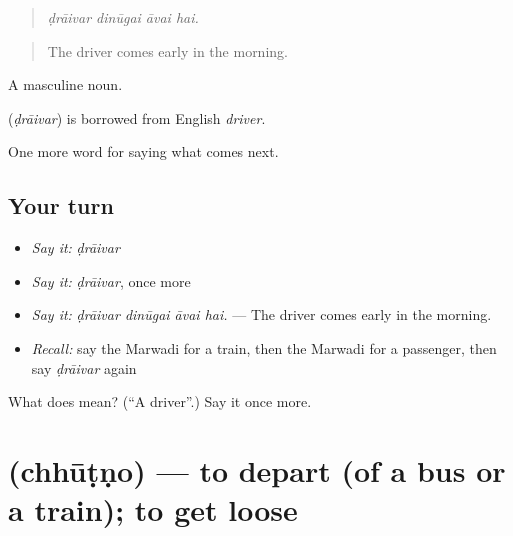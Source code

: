\begin{quote}
   
\end{quote}

\begin{quote}
\emph{ḍrāivar dinūgai āvai hai.}
\end{quote}

\begin{quote}
The driver comes early in the morning.
\end{quote}

A masculine noun.

\begin{cousinweb}
\textbf{} (\emph{ḍrāivar}) is borrowed from English \emph{driver}.
\end{cousinweb}

\begin{grammarlens}[title={What you've built}]
One more word for saying what comes next.
\end{grammarlens}

\subsection*{Your turn}
\begin{itemize}
\raggedright
  \item \emph{Say it:} \emph{ḍrāivar}
  \item \emph{Say it:} \emph{ḍrāivar}, once more
  \item \emph{Say it:} \emph{ḍrāivar dinūgai āvai hai.} — The driver comes early in the morning.
  \item \emph{Recall:} say the Marwadi for a train, then the Marwadi for a passenger, then say \emph{ḍrāivar} again
\end{itemize}

\begin{tcolorbox}[breakable,colback=teal!4,colframe=teal!35!black,title={Before you move on}]
What does  mean? (\textquotedblleft{}A driver\textquotedblright{}.) Say it once more.
\end{tcolorbox}
\section[\texorpdfstring{\mw{छूटणो} (chhūṭṇo)}{छूटणो (chhūṭṇo)}]{ (chhūṭṇo) — to depart (of a bus or a train); to get loose}

\label{lesson:MW-C218-chhutno}



